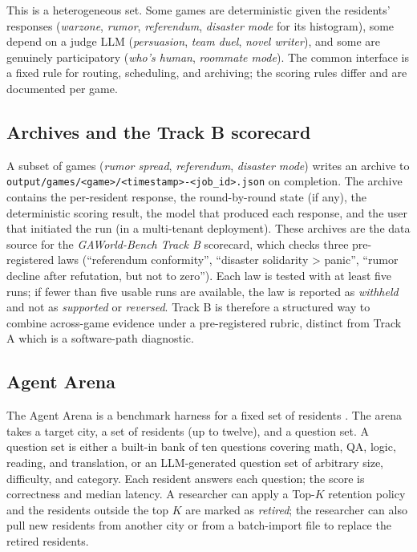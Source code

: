 This is a heterogeneous set.  Some games are deterministic given the
residents' responses (\emph{warzone}, \emph{rumor}, \emph{referendum},
\emph{disaster mode} for its histogram), some depend on a judge LLM
(\emph{persuasion}, \emph{team duel}, \emph{novel writer}), and some are
genuinely participatory (\emph{who's human}, \emph{roommate mode}).  The
common interface is a fixed rule for routing, scheduling, and archiving;
the scoring rules differ and are documented per game.

\subsection{Archives and the Track B scorecard}

A subset of games (\emph{rumor spread}, \emph{referendum},
\emph{disaster mode}) writes an archive to
\texttt{output/games/<game>/<timestamp>-<job\_id>.json} on completion.
The archive contains the per-resident response, the round-by-round state
(if any), the deterministic scoring result, the model that produced each
response, and the user that initiated the run (in a multi-tenant
deployment).  These archives are the data source for the
\emph{GAWorld-Bench Track B} scorecard, which checks three pre-registered
laws (``referendum conformity'', ``disaster solidarity > panic'', ``rumor
decline after refutation, but not to zero'').  Each law is tested with at
least five runs; if fewer than five usable runs are available, the law
is reported as \emph{withheld} and not as \emph{supported} or
\emph{reversed}.  Track B is therefore a structured way to combine
across-game evidence under a pre-registered rubric, distinct from Track A
which is a software-path diagnostic.

\subsection{Agent Arena}

The Agent Arena is a benchmark harness for a fixed set of residents
\citep{gaworldarena}.  The arena takes a target city, a set of residents
(up to twelve), and a question set.  A question set is either a built-in
bank of ten questions covering math, QA, logic, reading, and translation,
or an LLM-generated question set of arbitrary size, difficulty, and
category.  Each resident answers each question; the score is correctness
and median latency.  A researcher can apply a Top-$K$ retention policy
and the residents outside the top $K$ are marked as \emph{retired}; the
researcher can also pull new residents from another city or from a
batch-import file to replace the retired residents.

